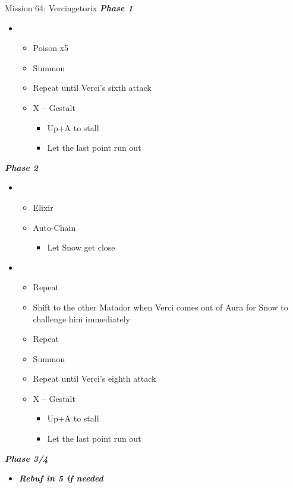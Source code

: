 \begin{battle}{Mission 64: Vercingetorix}
	\textit{\textbf{Phase 1}}
	\begin{itemize}
		\item \fourth
			\begin{itemize}
				\item Poison x5
				\item Summon
				\item Repeat until Verci's sixth attack
				\item X -- Gestalt
					\begin{itemize}
						\item Up+A to stall
						\item Let the last point run out
					\end{itemize}
			\end{itemize}
	\end{itemize}
	\textit{\textbf{Phase 2}}
	\begin{itemize}
		\item \third
			\begin{itemize}
				\item Elixir
				\item Auto-Chain
					\begin{itemize}
						\item Let Snow get close
					\end{itemize}
			\end{itemize}
		\item \second
			\begin{itemize}
				\item Repeat
				\item Shift to the other Matador when Verci comes out of Aura for Snow to challenge him immediately
				\item Repeat
				\item Summon
				\item Repeat until Verci's eighth attack
				\item X -- Gestalt
					\begin{itemize}
						\item Up+A to stall
						\item Let the last point run out
					\end{itemize}
			\end{itemize}
	\end{itemize}
	\textit{\textbf{Phase 3/4}}
	\begin{itemize}
		\item \textit{\textbf{Rebuf in 5 if needed}}

\end{itemize}
\end{battle}
